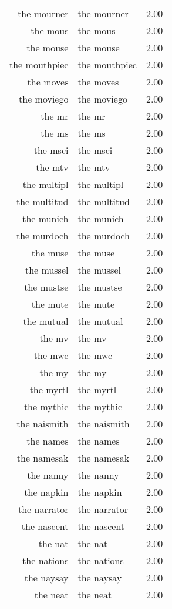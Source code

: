 \begin{table}[ht]
\begin{tabular}{rlr}
  the mourner & the mourner & 2.00 \\ 
  the mous & the mous & 2.00 \\ 
  the mouse & the mouse & 2.00 \\ 
  the mouthpiec & the mouthpiec & 2.00 \\ 
  the moves & the moves & 2.00 \\ 
  the moviego & the moviego & 2.00 \\ 
  the mr & the mr & 2.00 \\ 
  the ms & the ms & 2.00 \\ 
  the msci & the msci & 2.00 \\ 
  the mtv & the mtv & 2.00 \\ 
  the multipl & the multipl & 2.00 \\ 
  the multitud & the multitud & 2.00 \\ 
  the munich & the munich & 2.00 \\ 
  the murdoch & the murdoch & 2.00 \\ 
  the muse & the muse & 2.00 \\ 
  the mussel & the mussel & 2.00 \\ 
  the mustse & the mustse & 2.00 \\ 
  the mute & the mute & 2.00 \\ 
  the mutual & the mutual & 2.00 \\ 
  the mv & the mv & 2.00 \\ 
  the mwc & the mwc & 2.00 \\ 
  the my & the my & 2.00 \\ 
  the myrtl & the myrtl & 2.00 \\ 
  the mythic & the mythic & 2.00 \\ 
  the naismith & the naismith & 2.00 \\ 
  the names & the names & 2.00 \\ 
  the namesak & the namesak & 2.00 \\ 
  the nanny & the nanny & 2.00 \\ 
  the napkin & the napkin & 2.00 \\ 
  the narrator & the narrator & 2.00 \\ 
  the nascent & the nascent & 2.00 \\ 
  the nat & the nat & 2.00 \\ 
  the nations & the nations & 2.00 \\ 
  the naysay & the naysay & 2.00 \\ 
  the neat & the neat & 2.00 \\ 

\end{tabular}
\end{table}
